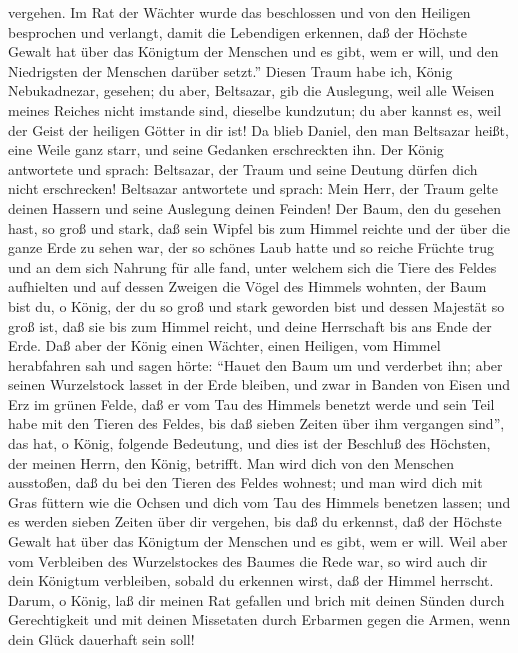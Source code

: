 vergehen.  Im Rat der Wächter wurde das beschlossen und
von den Heiligen besprochen und verlangt, damit die Lebendigen erkennen,
daß der Höchste Gewalt hat über das Königtum der Menschen und es gibt,
wem er will, und den Niedrigsten der Menschen darüber setzt.''
 Diesen Traum habe ich, König Nebukadnezar, gesehen; du
aber, Beltsazar, gib die Auslegung, weil alle Weisen meines Reiches
nicht imstande sind, dieselbe kundzutun; du aber kannst es, weil der
Geist der heiligen Götter in dir ist!  Da blieb Daniel,
den man Beltsazar heißt, eine Weile ganz starr, und seine Gedanken
erschreckten ihn. Der König antwortete und sprach: Beltsazar, der Traum
und seine Deutung dürfen dich nicht erschrecken! Beltsazar antwortete
und sprach: Mein Herr, der Traum gelte deinen Hassern und seine
Auslegung deinen Feinden!  Der Baum, den du gesehen hast,
so groß und stark, daß sein Wipfel bis zum Himmel reichte und der über
die ganze Erde zu sehen war,  der so schönes Laub hatte
und so reiche Früchte trug und an dem sich Nahrung für alle fand, unter
welchem sich die Tiere des Feldes aufhielten und auf dessen Zweigen die
Vögel des Himmels wohnten,  der Baum bist du, o König,
der du so groß und stark geworden bist und dessen Majestät so groß ist,
daß sie bis zum Himmel reicht, und deine Herrschaft bis ans Ende der
Erde.  Daß aber der König einen Wächter, einen Heiligen,
vom Himmel herabfahren sah und sagen hörte: ``Hauet den Baum um und
verderbet ihn; aber seinen Wurzelstock lasset in der Erde bleiben, und
zwar in Banden von Eisen und Erz im grünen Felde, daß er vom Tau des
Himmels benetzt werde und sein Teil habe mit den Tieren des Feldes, bis
daß sieben Zeiten über ihm vergangen sind'',  das hat, o
König, folgende Bedeutung, und dies ist der Beschluß des Höchsten, der
meinen Herrn, den König, betrifft.  Man wird dich von den
Menschen ausstoßen, daß du bei den Tieren des Feldes wohnest; und man
wird dich mit Gras füttern wie die Ochsen und dich vom Tau des Himmels
benetzen lassen; und es werden sieben Zeiten über dir vergehen, bis daß
du erkennst, daß der Höchste Gewalt hat über das Königtum der Menschen
und es gibt, wem er will.  Weil aber vom Verbleiben des
Wurzelstockes des Baumes die Rede war, so wird auch dir dein Königtum
verbleiben, sobald du erkennen wirst, daß der Himmel herrscht.
 Darum, o König, laß dir meinen Rat gefallen und brich
mit deinen Sünden durch Gerechtigkeit und mit deinen Missetaten durch
Erbarmen gegen die Armen, wenn dein Glück dauerhaft sein soll!
